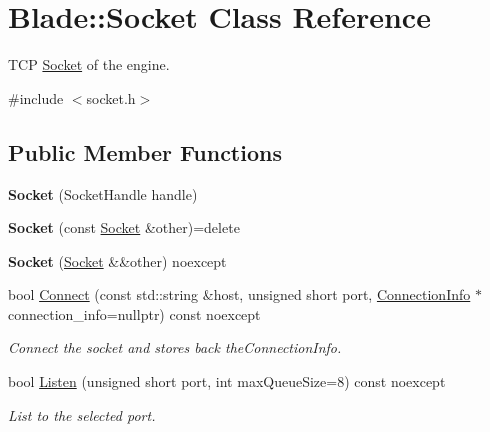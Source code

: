\hypertarget{class_blade_1_1_socket}{}\section{Blade\+:\+:Socket Class Reference}
\label{class_blade_1_1_socket}


T\+CP \hyperlink{class_blade_1_1_socket}{Socket} of the engine.  




{\ttfamily \#include $<$socket.\+h$>$}

\subsection*{Public Member Functions}
\begin{DoxyCompactItemize}
\item 
\mbox{\label{class_blade_1_1_socket_a0070e8796365ca743b0dbb2bed9c691f}} 
{\bfseries Socket} (Socket\+Handle handle)
\item 
\mbox{\label{class_blade_1_1_socket_a3c8cc7d01135f4e78298048fe6950151}} 
{\bfseries Socket} (const \hyperlink{class_blade_1_1_socket}{Socket} \&other)=delete
\item 
\mbox{\label{class_blade_1_1_socket_a3966e8e3444f85b1a8fae6c9b42e18f0}} 
{\bfseries Socket} (\hyperlink{class_blade_1_1_socket}{Socket} \&\&other) noexcept
\item 
bool \hyperlink{class_blade_1_1_socket_a3a7d54bb3818ac3145095dc1f3cf7a51}{Connect} (const std\+::string \&host, unsigned short port, \hyperlink{struct_blade_1_1_connection_info}{Connection\+Info} $\ast$connection\+\_\+info=nullptr) const noexcept
\begin{DoxyCompactList}\small\item\em Connect the socket and stores back the\+Connection\+Info. \end{DoxyCompactList}\item 
bool \hyperlink{class_blade_1_1_socket_a801888c94b0ba8cc2ca912a72ee50a1b}{Listen} (unsigned short port, int max\+Queue\+Size=8) const noexcept
\begin{DoxyCompactList}\small\item\em List to the selected port. \end{DoxyCompactList}\item 

\end{DoxyCompactItemize}
